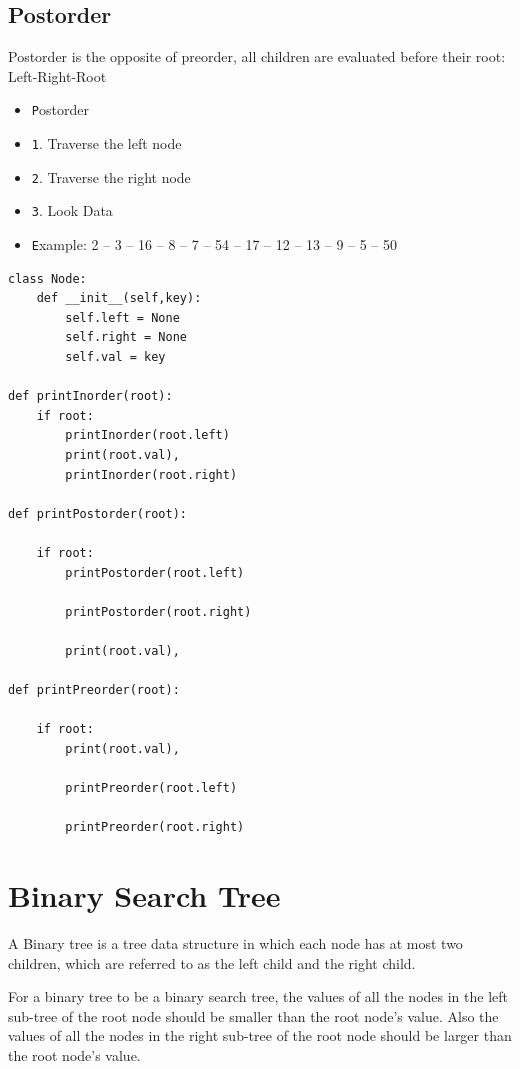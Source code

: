 \documentclass[12pt]{article}
\begin{document}
    \subsection{Postorder}
    Postorder is the opposite of preorder, all children are evaluated before their root: Left-Right-Root
    \begin{itemize}
     \item \texttt Postorder
     \item \texttt 1. Traverse the left node
     \item \texttt 2. Traverse the right node 
     \item \texttt 3. Look Data
     \item \texttt Example: 2 – 3 – 16 – 8 – 7 – 54 – 17 – 12 – 13 – 9 – 5 – 50
    \end{itemize}

 \begin{verbatim}
class Node: 
    def __init__(self,key): 
        self.left = None
        self.right = None
        self.val = key 

def printInorder(root): 
    if root: 
        printInorder(root.left) 
        print(root.val), 
        printInorder(root.right) 
  
def printPostorder(root): 
  
    if root: 
        printPostorder(root.left) 
  
        printPostorder(root.right) 
  
        print(root.val), 
  
def printPreorder(root): 
  
    if root: 
        print(root.val), 
  
        printPreorder(root.left) 
  
        printPreorder(root.right) 
\end{verbatim}


\section{Binary Search Tree}
 A Binary tree is a tree data structure in which each node has at most two children, which are referred to as the left child and the right child.
 
 For a binary tree to be a binary search tree, the values of all the nodes in the left sub-tree of the root node should be smaller than the root node's value. Also the values of all the nodes in the right sub-tree of the root node should be larger than the root node's value.
 
\end{document}
